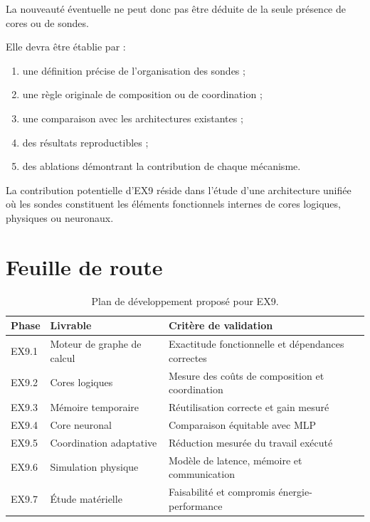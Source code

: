 \documentclass[11pt,a4paper]{article}
\begin{document}
La nouveauté éventuelle ne peut donc pas être déduite de la seule
présence de cores ou de sondes.

Elle devra être établie par :
\begin{enumerate}
  \item une définition précise de l'organisation des sondes ;
  \item une règle originale de composition ou de coordination ;
  \item une comparaison avec les architectures existantes ;
  \item des résultats reproductibles ;
  \item des ablations démontrant la contribution de chaque mécanisme.
\end{enumerate}

La contribution potentielle d'EX9 réside dans l'étude d'une
architecture unifiée où les sondes constituent les éléments
fonctionnels internes de cores logiques, physiques ou neuronaux.

\section{Feuille de route}

\begin{table}[H]
\centering
\small
\begin{tabularx}{\textwidth}{p{2.0cm}p{4.0cm}X}
\toprule
Phase & Livrable & Critère de validation \\
\midrule
EX9.1
& Moteur de graphe de calcul
& Exactitude fonctionnelle et dépendances correctes \\

EX9.2
& Cores logiques
& Mesure des coûts de composition et coordination \\

EX9.3
& Mémoire temporaire
& Réutilisation correcte et gain mesuré \\

EX9.4
& Core neuronal
& Comparaison équitable avec MLP \\

EX9.5
& Coordination adaptative
& Réduction mesurée du travail exécuté \\

EX9.6
& Simulation physique
& Modèle de latence, mémoire et communication \\

EX9.7
& Étude matérielle
& Faisabilité et compromis énergie-performance \\
\bottomrule
\end{tabularx}
\caption{Plan de développement proposé pour EX9.}
\end{table}
\end{document}
